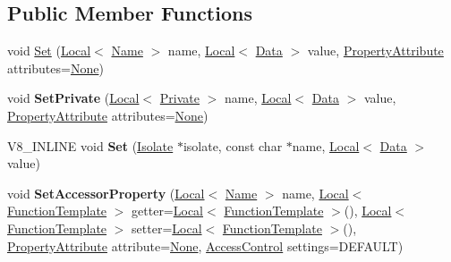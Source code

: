 \subsection*{Public Member Functions}
\begin{DoxyCompactItemize}
\item 
void \mbox{\hyperlink{classv8_1_1Template_a623b9f0cdd87dc861516f276cc9a7cfa}{Set}} (\mbox{\hyperlink{classv8_1_1Local}{Local}}$<$ \mbox{\hyperlink{classv8_1_1Name}{Name}} $>$ name, \mbox{\hyperlink{classv8_1_1Local}{Local}}$<$ \mbox{\hyperlink{classv8_1_1Data}{Data}} $>$ value, \mbox{\hyperlink{namespacev8_a05f25f935e108a1ea2d150e274602b87}{Property\+Attribute}} attributes=\mbox{\hyperlink{namespacev8_a05f25f935e108a1ea2d150e274602b87a7ab4d58719c33b3ea2dfaefa29b111df}{None}})
\item 
\mbox{\label{classv8_1_1Template_a91214bdb0cc2d6534c81742e67fc4cc4}} 
void {\bfseries Set\+Private} (\mbox{\hyperlink{classv8_1_1Local}{Local}}$<$ \mbox{\hyperlink{classv8_1_1Private}{Private}} $>$ name, \mbox{\hyperlink{classv8_1_1Local}{Local}}$<$ \mbox{\hyperlink{classv8_1_1Data}{Data}} $>$ value, \mbox{\hyperlink{namespacev8_a05f25f935e108a1ea2d150e274602b87}{Property\+Attribute}} attributes=\mbox{\hyperlink{namespacev8_a05f25f935e108a1ea2d150e274602b87a7ab4d58719c33b3ea2dfaefa29b111df}{None}})
\item 
\mbox{\label{classv8_1_1Template_adc2fc88ac8df0d12b44d4c16ff0128cc}} 
V8\+\_\+\+I\+N\+L\+I\+NE void {\bfseries Set} (\mbox{\hyperlink{classv8_1_1Isolate}{Isolate}} $\ast$isolate, const char $\ast$name, \mbox{\hyperlink{classv8_1_1Local}{Local}}$<$ \mbox{\hyperlink{classv8_1_1Data}{Data}} $>$ value)
\item 
\mbox{\label{classv8_1_1Template_a5c702a91581d6cf8cfb72c24ba8b8d17}} 
void {\bfseries Set\+Accessor\+Property} (\mbox{\hyperlink{classv8_1_1Local}{Local}}$<$ \mbox{\hyperlink{classv8_1_1Name}{Name}} $>$ name, \mbox{\hyperlink{classv8_1_1Local}{Local}}$<$ \mbox{\hyperlink{classv8_1_1FunctionTemplate}{Function\+Template}} $>$ getter=\mbox{\hyperlink{classv8_1_1Local}{Local}}$<$ \mbox{\hyperlink{classv8_1_1FunctionTemplate}{Function\+Template}} $>$(), \mbox{\hyperlink{classv8_1_1Local}{Local}}$<$ \mbox{\hyperlink{classv8_1_1FunctionTemplate}{Function\+Template}} $>$ setter=\mbox{\hyperlink{classv8_1_1Local}{Local}}$<$ \mbox{\hyperlink{classv8_1_1FunctionTemplate}{Function\+Template}} $>$(), \mbox{\hyperlink{namespacev8_a05f25f935e108a1ea2d150e274602b87}{Property\+Attribute}} attribute=\mbox{\hyperlink{namespacev8_a05f25f935e108a1ea2d150e274602b87a7ab4d58719c33b3ea2dfaefa29b111df}{None}}, \mbox{\hyperlink{namespacev8_a31d8355cb043d7d2dda3f4a52760b64e}{Access\+Control}} settings=D\+E\+F\+A\+U\+LT)

\end{DoxyCompactItemize}
